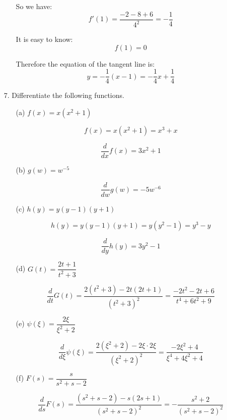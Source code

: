 \documentclass{article}
\begin{document}
\begin{enumerate}
\begin{enumerate}
            So we have:
            $$ f'(1) = \frac{-2-8+6}{4^2} = -\frac{1}{4} $$
            
            It is easy to know:
            $$ f(1) = 0 $$
            
            Therefore the equation of the tangent line is:
            $$ y = -\frac{1}{4}(x - 1) = -\frac{1}{4}x + \frac{1}{4} $$
            
        \end{enumerate}
    
    
    \item[7.] Differentiate the following functions. 
    
        \begin{enumerate}
            
            \item[(a)] $ f(x) = x(x^2 + 1) $
            
            $$ f(x) =  x(x^2 + 1) = x^3 + x $$
            
            $$ \frac{d}{dx} f(x) = 3x^2 + 1 $$
            
            \item[(b)] $ g(w) = w^{-5} $
            
            $$ \frac{d}{dw} g(w) = -5w^{-6} $$
            
            \item[(c)] $ h(y) = y(y-1)(y+1) $
            
            $$ h(y) = y(y-1)(y+1) = y(y^2 - 1) = y^3 - y $$
            
            $$ \frac{d}{dy} h(y) = 3y^2 - 1 $$
            
            \item[(d)] $ G(t) = \dfrac{2t + 1}{t^2 + 3} $
            
            $$ \frac{d}{dt} G(t) = \frac{ 2(t^2+3) - 2t(2t+1) }{ (t^2 + 3)^2 } = \frac{ -2t^2 - 2t + 6 }{ t^4 + 6t^2 + 9 }$$
            
            \item[(e)] $ \psi(\xi) = \dfrac{2\xi}{\xi^2 + 2} $
            
            $$ \frac{d}{d\xi} \psi(\xi) = \frac{ 2(\xi^2+2) - 2\xi \cdot 2\xi }{ (\xi^2+2)^2 } = \frac{ -2\xi^2+4 }{ \xi^4+4\xi^2+4 } $$
            
            \item[(f)] $ F(s) = \dfrac{s}{s^2 + s - 2} $
            
            $$ \frac{d}{ds} F(s) = \frac{ (s^2+s-2) - s(2s+1) }{ (s^2+s-2)^2 } = -\frac{ s^2+2 }{ (s^2+s-2)^2 } $$
            

\end{enumerate}
\end{enumerate}
\end{document}

